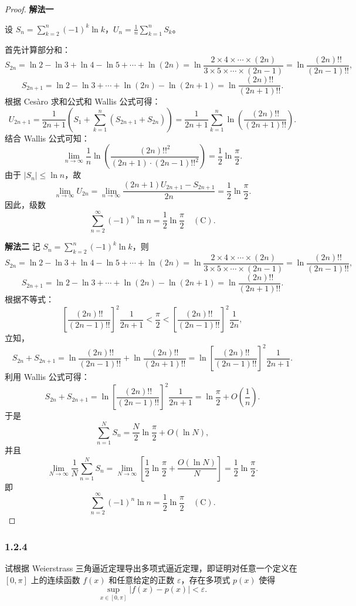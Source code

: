 \documentclass[12pt]{ctexart}
\begin{document}
\begin{proof}
\textbf{解法一}

设 $S_n = \sum_{k=2}^n (-1)^k \ln k$，$U_n = \frac{1}{n} \sum_{k=1}^n S_k$。

首先计算部分和：
\[
S_{2n} = \ln 2 - \ln 3 + \ln 4 - \ln 5 + \cdots + \ln (2n) 
= \ln \frac{2 \times 4 \times \cdots \times (2n)}{3 \times 5 \times \cdots \times (2n-1)}
= \ln \frac{(2n)!!}{(2n-1)!!},
\]
\[
S_{2n+1} = \ln 2 - \ln 3 + \cdots + \ln (2n) - \ln (2n+1) 
= \ln \frac{(2n)!!}{(2n+1)!!}.
\]
根据 Cesàro 求和公式和 Wallis 公式可得：
\[
U_{2n+1} = \frac{1}{2n+1} \left(S_1 + \sum_{k=1}^n (S_{2n+1} + S_{2n})\right)
= \frac{1}{2n+1} \sum_{k=1}^n \ln \left(\frac{(2n)!!}{(2n+1)!!}\right).
\]
结合 Wallis 公式可知：
\[
\lim_{n \to \infty} \frac{1}{n} \ln \left(\frac{(2n)!!^2}{(2n+1) \cdot (2n-1)!!^2}\right) 
= \frac{1}{2} \ln \frac{\pi}{2}.
\]
由于 $|S_n| \leq \ln n$，故
\[
\lim_{n \to \infty} U_{2n} = \lim_{n \to \infty} \frac{(2n+1)U_{2n+1} - S_{2n+1}}{2n} 
= \frac{1}{2} \ln \frac{\pi}{2}.
\]
因此，级数
\[
\sum_{n=2}^\infty (-1)^n \ln n = \frac{1}{2} \ln \frac{\pi}{2} \quad (\text{C}).
\]

\textbf{解法二}
记 $S_n = \sum_{k=2}^n (-1)^k \ln k$，则
\[
S_{2n} = \ln 2 - \ln 3 + \ln 4 - \ln 5 + \cdots + \ln (2n)
= \ln \frac{2 \times 4 \times \cdots \times (2n)}{3 \times 5 \times \cdots \times (2n-1)}
= \ln \frac{(2n)!!}{(2n-1)!!},
\]
\[
S_{2n+1} = \ln 2 - \ln 3 + \cdots + \ln (2n) - \ln (2n+1)
= \ln \frac{(2n)!!}{(2n+1)!!}.
\]
根据不等式：
\[
\left[\frac{(2n)!!}{(2n-1)!!}\right]^2 \frac{1}{2n+1} < \frac{\pi}{2}
< \left[\frac{(2n)!!}{(2n-1)!!}\right]^2 \frac{1}{2n},
\]
立知，
\[
S_{2n} + S_{2n+1} = \ln \frac{(2n)!!}{(2n-1)!!} + \ln \frac{(2n)!!}{(2n+1)!!}
= \ln \left[\frac{(2n)!!}{(2n-1)!!}\right]^2 \frac{1}{2n+1}.
\]
利用 Wallis 公式可得：
\[
S_{2n} + S_{2n+1} = \ln \left[\frac{(2n)!!}{(2n-1)!!}\right]^2 \frac{1}{2n+1} = \ln \frac{\pi}{2} + O\left(\frac{1}{n}\right).
\]
于是
\[
\sum_{n=1}^N S_n = \frac{N}{2} \ln \frac{\pi}{2} + O(\ln N),
\]
并且
\[
\lim_{N \to \infty} \frac{1}{N} \sum_{n=1}^N S_n = \lim_{N \to \infty} \left[\frac{1}{2} \ln \frac{\pi}{2} + \frac{O(\ln N)}{N}\right] = \frac{1}{2} \ln \frac{\pi}{2}.
\]
即
\[
\sum_{n=2}^\infty (-1)^n \ln n = \frac{1}{2} \ln \frac{\pi}{2} \quad (\text{C}).
\]
\end{proof}

\subsubsection*{1.2.4}
试根据 Weierstrass 三角逼近定理导出多项式逼近定理，即证明对任意一个定义在 $[0, \pi]$ 上的连续函数 $f(x)$ 和任意给定的正数 $\varepsilon$，存在多项式 $p(x)$ 使得
\[
\sup_{x \in [0, \pi]} \lvert f(x) - p(x) \rvert < \varepsilon.
\]
\end{document}
